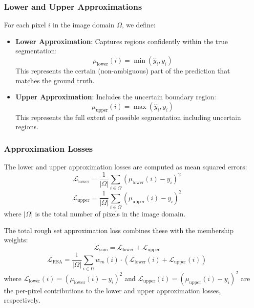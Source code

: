 \documentclass[review]{elsarticle}
\begin{document}
\subsubsection{Lower and Upper Approximations}
For each pixel $i$ in the image domain $\Omega$, we define:
\begin{itemize}
    \item \textbf{Lower Approximation}: Captures regions confidently within the true segmentation:
    \begin{equation}\label{Eq-10}
        \mu_{\text{lower}}(i) = \min(\hat{y}_i, y_i)
    \end{equation}
    This represents the certain (non-ambiguous) part of the prediction that matches the ground truth.
    
    \item \textbf{Upper Approximation}: Includes the uncertain boundary region:
    \begin{equation}\label{Eq-11}
        \mu_{\text{upper}}(i) = \max(\hat{y}_i, y_i)
    \end{equation}
    This represents the full extent of possible segmentation including uncertain regions.
\end{itemize}

\subsubsection{Approximation Losses}
The lower and upper approximation losses are computed as mean squared errors:
\begin{equation}\label{Eq-12}
    \mathcal{L}_{\text{lower}} = \frac{1}{|\Omega|} \sum_{i \in \Omega} (\mu_{\text{lower}}(i) - y_i)^2
\end{equation}
\begin{equation}\label{Eq-13}
    \mathcal{L}_{\text{upper}} = \frac{1}{|\Omega|} \sum_{i \in \Omega} (\mu_{\text{upper}}(i) - y_i)^2
\end{equation}
where $|\Omega|$ is the total number of pixels in the image domain.

The total rough set approximation loss combines these with the membership weights:
\begin{equation}\label{Eq-14}
    \mathcal{L}_{\text{sum}} = \mathcal{L}_{\text{lower}} + \mathcal{L}_{\text{upper}}
\end{equation}
\begin{equation}\label{Eq-15}
    \mathcal{L}_{\text{RSA}} = \frac{1}{|\Omega|} \sum_{i \in \Omega} w_m(i) \cdot \left( \mathcal{L}_{\text{lower}}(i) + \mathcal{L}_{\text{upper}}(i) \right)
\end{equation}
where $\mathcal{L}_{\text{lower}}(i) = (\mu_{\text{lower}}(i) - y_i)^2$ and $\mathcal{L}_{\text{upper}}(i) = (\mu_{\text{upper}}(i) - y_i)^2$ are the per-pixel contributions to the lower and upper approximation losses, respectively.
\end{document}
